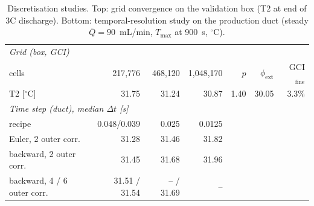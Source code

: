 \begin{table}[h]\centering\caption{Discretisation studies. Top: grid convergence on the validation box (T2 at end of 3C discharge). Bottom: temporal-resolution study on the production duct (steady $\bar Q=90$~mL/min, $T_\mathrm{max}$ at 900~s, $^\circ$C).}\label{tab:indep}
\begin{tabular}{lrrrrrr}\toprule
\multicolumn{7}{l}{\emph{Grid (box, GCI)}}\\
cells & 217,776 & 468,120 & 1,048,170 & $p$ & $\phi_\mathrm{ext}$ & GCI$_\mathrm{fine}$ \\
T2 [$^\circ$C] & 31.75 & 31.24 & 30.87 & 1.40 & 30.05 & 3.3\% \\ \midrule
\multicolumn{7}{l}{\emph{Time step (duct), median $\Delta t$ [s]}}\\
recipe & 0.048/0.039 & 0.025 & 0.0125 & & & \\
Euler, 2 outer corr. & 31.28 & 31.46 & 31.82 & & & \\
backward, 2 outer corr. & 31.45 & 31.68 & 31.96 & & & \\
backward, 4 / 6 outer corr. & 31.51 / 31.54 & -- / 31.69 & -- & & & \\ \bottomrule
\end{tabular}\end{table}
